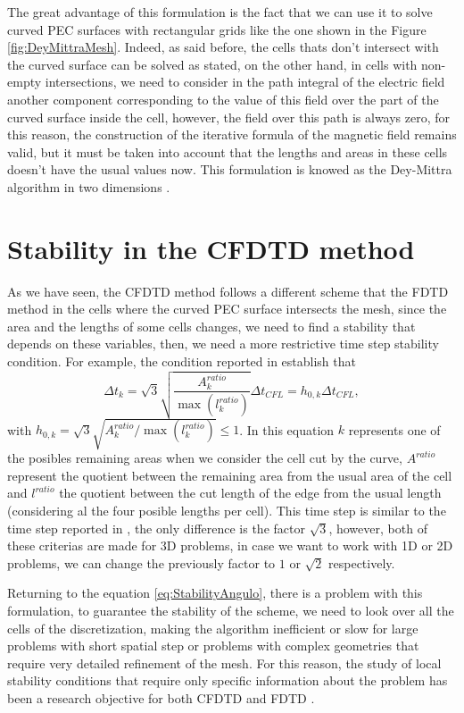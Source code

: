 \documentclass[12pt, oneside]{book}
\begin{document}
The great advantage of this formulation is the fact that we can use it to solve curved PEC surfaces with rectangular grids like the one shown in the Figure \ref{fig:DeyMittraMesh}. Indeed, as said before, the cells thats don't intersect with the curved surface can be solved as stated, on the other hand, in cells with non-empty intersections, we need to consider in the path integral of the electric field another component corresponding to the value of this field over the part of the curved surface inside the cell, however, the field over this path is always zero, for this reason, the construction of the iterative formula of the magnetic field remains valid, but it must be taken into account that the lengths and areas in these cells doesn't have the usual values now. This formulation is knowed as the Dey-Mittra algorithm in two dimensions \cite{DeyMittra1997}.

\section{Stability in the CFDTD method}

As we have seen, the CFDTD method follows a different scheme that the FDTD method in the cells where the curved PEC surface intersects the mesh, since the area and the lengths of some cells changes, we need to find a stability that depends on these variables, then, we need a more restrictive time step stability condition. For example, the condition reported in \cite{7518629} establish that
\begin{equation}
    \Delta t_k = \sqrt{3} \sqrt{\dfrac{A_k^{ratio}}{\max \left( l_k^{ratio} \right)}}\Delta t_{CFL} = h_{0, k} \Delta t_{CFL},
\label{eq:StabilityAngulo}
\end{equation}
with $h_{0, k} = \sqrt{3} \sqrt{A_k^{ratio}/\max \left( l_k^{ratio} \right)} \leq 1$. In this equation $k$ represents one of the posibles remaining areas when we consider the cell cut by the curve, $A^{ratio}$ represent the quotient between the remaining area from the usual area of the cell and $l^{ratio}$ the quotient between the cut length of the edge from the usual length (considering al the four posible lengths per cell). This time step is similar to the time step reported in \cite{1638381}, the only difference is the factor $\sqrt{3}$, however, both of these criterias are made for 3D problems, in case we want to work with 1D or 2D problems, we can change the previously factor to $1$ or $\sqrt{2}$ respectively.

Returning to the equation \ref{eq:StabilityAngulo}, there is a problem with this formulation, to guarantee the stability of the scheme, we need to look over all the cells of the discretization, making the algorithm inefficient or slow for large problems with short spatial step or problems with complex geometries that require very detailed refinement of the mesh. For this reason, the study of local stability conditions that require only specific information about the problem has been a research objective for both CFDTD and FDTD \cite{7779120}.
\end{document}
